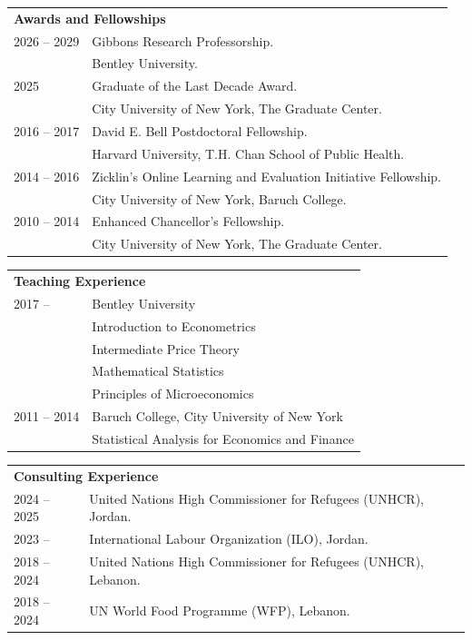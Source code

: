\documentclass[12pt]{article}
\begin{document}
\vspace{0.5em}

\begin{tabular}{p{3cm}p{\dimexpr\textwidth-3cm\relax}}

\multicolumn{2}{l}{\textbf{Awards and Fellowships}} \\[5pt]

2026 -- 2029 & Gibbons Research Professorship. \\
& Bentley University. \\[3pt]

2025 & Graduate of the Last Decade Award. \\
& City University of New York, The Graduate Center. \\[3pt]

2016 -- 2017 & David E. Bell Postdoctoral Fellowship. \\
& Harvard University, T.H. Chan School of Public Health. \\[3pt] 

2014 -- 2016 & Zicklin's Online Learning and Evaluation Initiative Fellowship. \\
& City University of New York, Baruch College.  \\[3pt]  

2010 -- 2014 &  Enhanced Chancellor's Fellowship. \\
& City University of New York, The Graduate Center. \\[3pt] 
\end{tabular}

\begin{tabular}{p{3cm}p{\dimexpr\textwidth-3cm\relax}}
\multicolumn{2}{l}{\textbf{Teaching Experience}} \\[5pt]
2017 -- & Bentley University \\ 
& Introduction to Econometrics \\ 
& Intermediate Price Theory \\ 
& Mathematical Statistics \\ 
& Principles of Microeconomics \\[3pt]

2011 -- 2014 & Baruch College, City University of New York \\ 
& Statistical Analysis for Economics and Finance \\

\end{tabular}


\begin{tabular}{p{3cm}p{\dimexpr\textwidth-3cm\relax}}



\multicolumn{2}{l}{\textbf{Consulting Experience}} \\[5pt]
2024 -- 2025 & United Nations High Commissioner for Refugees (UNHCR), Jordan. \\
2023 -- & International Labour Organization (ILO), Jordan. \\ 
2018 -- 2024 & United Nations High Commissioner for Refugees (UNHCR), Lebanon. \\ 
2018 -- 2024 & UN World Food Programme (WFP), Lebanon. \\ 
\end{tabular}
\end{document}
